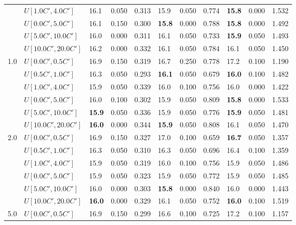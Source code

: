 \begin{table}[h]
{\begin{tabular}{|l|l||l|l|l||l|l|l||l|l|l|}
       & $U[1.0C',4.0C']$ & 16.1 & 0.050 & 0.313 & 15.9 & 0.050 & 0.774 & \textbf{15.8} & 0.000 & 1.532 \\
       & $U[0.0C',5.0C']$ & 16.1 & 0.150 & 0.300 & \textbf{15.8} & 0.000 & 0.788 & \textbf{15.8} & 0.000 & 1.492 \\
       & $U[5.0C',10.0C']$ & 16.0 & 0.000 & 0.311 & 16.1 & 0.050 & 0.733 & \textbf{15.9} & 0.050 & 1.493 \\
       & $U[10.0C',20.0C']$ & 16.2 & 0.000 & 0.332 & 16.1 & 0.050 & 0.784 & 16.1 & 0.050 & 1.450 \\
      \hline\hline
      \multirow{6}{*}{1.0} & $U[0.0C',0.5C']$ & 16.9 & 0.150 & 0.319 & 16.7 & 0.250 & 0.778 & 17.2 & 0.100 & 1.190 \\
       & $U[0.5C',1.0C']$ & 16.3 & 0.050 & 0.293 & \textbf{16.1} & 0.050 & 0.679 & \textbf{16.0} & 0.100 & 1.482 \\
       & $U[1.0C',4.0C']$ & 15.9 & 0.050 & 0.339 & 16.0 & 0.100 & 0.756 & 16.0 & 0.000 & 1.422 \\
       & $U[0.0C',5.0C']$ & 16.0 & 0.100 & 0.302 & 15.9 & 0.050 & 0.809 & \textbf{15.8} & 0.000 & 1.533 \\
       & $U[5.0C',10.0C']$ & \textbf{15.9} & 0.050 & 0.336 & 15.9 & 0.050 & 0.776 & \textbf{15.9} & 0.050 & 1.481 \\
       & $U[10.0C',20.0C']$ & \textbf{16.0} & 0.000 & 0.344 & \textbf{15.9} & 0.050 & 0.808 & 16.1 & 0.050 & 1.470 \\
      \hline\hline
      \multirow{6}{*}{2.0} & $U[0.0C',0.5C']$ & 16.9 & 0.150 & 0.327 & 17.0 & 0.100 & 0.659 & \textbf{16.7} & 0.050 & 1.357 \\
       & $U[0.5C',1.0C']$ & 16.3 & 0.050 & 0.310 & 16.3 & 0.050 & 0.696 & 16.4 & 0.100 & 1.359 \\
       & $U[1.0C',4.0C']$ & 15.9 & 0.050 & 0.319 & 16.0 & 0.100 & 0.756 & 15.9 & 0.050 & 1.486 \\
       & $U[0.0C',5.0C']$ & 15.9 & 0.050 & 0.323 & 15.9 & 0.050 & 0.772 & 15.9 & 0.050 & 1.485 \\
       & $U[5.0C',10.0C']$ & 16.0 & 0.000 & 0.303 & \textbf{15.8} & 0.000 & 0.840 & 16.0 & 0.000 & 1.443 \\
       & $U[10.0C',20.0C']$ & \textbf{16.0} & 0.000 & 0.329 & 16.1 & 0.050 & 0.752 & \textbf{16.0} & 0.100 & 1.519 \\
      \hline\hline
      \multirow{6}{*}{5.0} & $U[0.0C',0.5C']$ & 16.9 & 0.150 & 0.299 & 16.6 & 0.100 & 0.725 & 17.2 & 0.100 & 1.157 \\

\end{tabular}}
\end{table}
